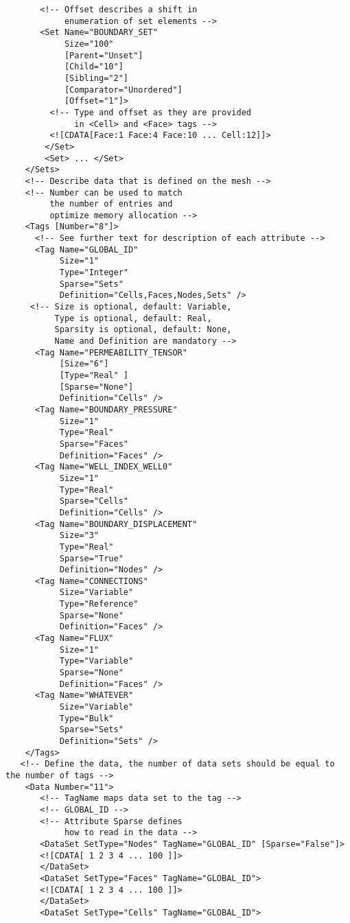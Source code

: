 \documentclass[14pt]{article}
\begin{document}
\begin{lstlisting}
       <!-- Offset describes a shift in 
            enumeration of set elements -->
       <Set Name="BOUNDARY_SET"
            Size="100"
            [Parent="Unset"]
            [Child="10"]
            [Sibling="2"]
            [Comparator="Unordered"]
            [Offset="1"]>
         <!-- Type and offset as they are provided
              in <Cell> and <Face> tags -->
         <![CDATA[Face:1 Face:4 Face:10 ... Cell:12]]>
        </Set>
        <Set> ... </Set>
    </Sets>
    <!-- Describe data that is defined on the mesh -->
    <!-- Number can be used to match 
         the number of entries and
         optimize memory allocation -->
    <Tags [Number="8"]>
      <!-- See further text for description of each attribute -->
      <Tag Name="GLOBAL_ID" 
           Size="1" 
           Type="Integer" 
           Sparse="Sets" 
           Definition="Cells,Faces,Nodes,Sets" />
     <!-- Size is optional, default: Variable,
          Type is optional, default: Real,
          Sparsity is optional, default: None,
          Name and Definition are mandatory -->
      <Tag Name="PERMEABILITY_TENSOR" 
           [Size="6"] 
           [Type="Real" ]
           [Sparse="None"] 
           Definition="Cells" />
      <Tag Name="BOUNDARY_PRESSURE" 
           Size="1" 
           Type="Real" 
           Sparse="Faces" 
           Definition="Faces" />
      <Tag Name="WELL_INDEX_WELL0" 
           Size="1" 
           Type="Real" 
           Sparse="Cells" 
           Definition="Cells" />
      <Tag Name="BOUNDARY_DISPLACEMENT" 
           Size="3" 
           Type="Real" 
           Sparse="True" 
           Definition="Nodes" />
      <Tag Name="CONNECTIONS"
           Size="Variable"
           Type="Reference"
           Sparse="None"
           Definition="Faces" />
      <Tag Name="FLUX"
           Size="1"
           Type="Variable"
           Sparse="None"
           Definition="Faces" />
      <Tag Name="WHATEVER"
           Size="Variable"
           Type="Bulk"
           Sparse="Sets"
           Definition="Sets" />
    </Tags>
   <!-- Define the data, the number of data sets should be equal to the number of tags -->
    <Data Number="11">
       <!-- TagName maps data set to the tag -->
       <!-- GLOBAL_ID -->
       <!-- Attribute Sparse defines 
            how to read in the data -->
       <DataSet SetType="Nodes" TagName="GLOBAL_ID" [Sparse="False"]> 
	   <![CDATA[ 1 2 3 4 ... 100 ]]>
       </DataSet>
       <DataSet SetType="Faces" TagName="GLOBAL_ID">
	   <![CDATA[ 1 2 3 4 ... 100 ]]>
       </DataSet>
       <DataSet SetType="Cells" TagName="GLOBAL_ID">

\end{lstlisting}
\end{document}
